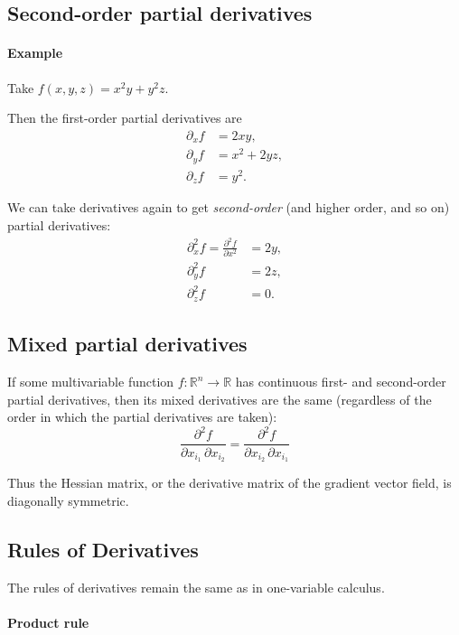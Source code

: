 \documentclass[11pt]{article}
\begin{document}
\subsection*{Second-order partial derivatives}

\paragraph{Example}

Take \(f(x, y, z) = x^2 y + y^2 z\).

Then the first-order partial derivatives are
\begin{align*}
    \partial_x f &= 2xy, \\
    \partial_y f &= x^2 + 2yz, \\
    \partial_z f &= y^2.
\end{align*}

We can take derivatives again to get \emph{second-order} (and higher order, and so on) partial derivatives:
\begin{align*}
    \partial_x^2 f = \frac{\partial^2 f}{\partial x^2} &= 2y, \\
    \partial_y^2 f &= 2z, \\
    \partial_z^2 f &= 0.
\end{align*}

\subsection*{Mixed partial derivatives}

If some multivariable function \(f \colon \mathbb R^n \to \mathbb R\) has continuous first- and second-order partial derivatives, then its mixed derivatives are the same (regardless of the order in which the partial derivatives are taken):
\[
    \frac{\partial^2 f}{\partial x_{i_1} \, \partial x_{i_2}} = \frac{\partial^2 f}{\partial x_{i_2} \, \partial x_{i_1}}
\]

Thus the Hessian matrix, or the derivative matrix of the gradient vector field, is diagonally symmetric.

\subsection*{Rules of Derivatives}

The rules of derivatives remain the same as in one-variable calculus. 

\paragraph{Product rule}
\end{document}
